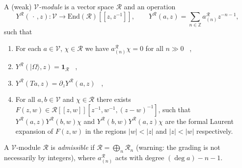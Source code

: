 \documentclass[12pt,letterpaper,reqno]{amsart}
\numberwithin{equation}{section}
\newcommand\bid{{\mathbf 1}}
\newcommand\vac{{|\Omega\rangle}}
\newcommand{\vertex}{\mathcal{V}}
\newcommand{\vrep}{\mathcal{R}}
\newcommand{\abs}[1]{\lvert#1\rvert}
\newcommand{\ti}[1]{\textit{#1}}
\begin{document}
\begin{defn}
A (weak) \ti{$\vertex$-module} is a vector space $\vrep$
and an operation
\begin{equation}
Y^\vrep(\,\cdot\,,z): \vertex \to \mathrm{End}(\vrep)[[z,z^{-1}]],\qquad
Y^\vrep(a,z) = \sum_{n\in \mathbb{Z}} a^\vrep_{(n)} z^{-n-1},
\end{equation}
such that
\begin{enumerate}

\item For each \(a \in \vertex \), \( \chi \in \vrep \) we have \(a^\vrep_{(n)}\chi=0\) for all \(n\gg 0\) \, ,

\item 
  $Y^\vrep(\vac, z) = \bid_\vrep$ \, ,

\item $Y^\vrep(T a, z) = \partial_z Y^\vrep(a,z)$ \, ,

\item For all $a,b \in \vertex$ and $\chi \in \vrep$
there exists $F(z,w) \in \vrep[[z,w]][z^{-1},w^{-1},(z-w)^{-1}]$, such that
$Y^\vrep(a,z) Y^\vrep(b,w) \chi$ and 
$Y^\vrep(b,w) Y^\vrep(a,z) \chi$ are the
formal Laurent expansion of $F(z,w)$ in the regions
$\abs{w} < \abs{z}$ and $\abs{z} < \abs{w}$
respectively.
\end{enumerate}

\end{defn}

\begin{defn}
A $\vertex$-module $\vrep$ is \ti{admissible} if
$\vrep = \bigoplus_n \vrep_n$ (warning:
the grading is not necessarily by integers),
where $a_{(n)}^\vrep$ acts with degree $(\deg a) - n - 1$.
\end{defn}





\end{document}
